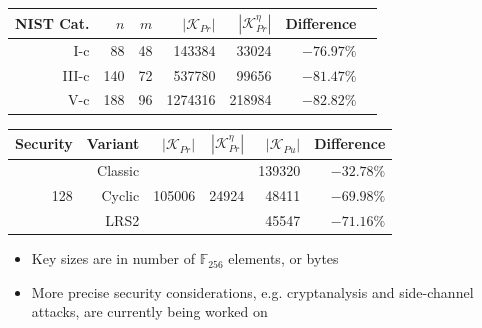 \documentclass[12pt]{beamer}
\begin{document}
\begin{frame}
  \begin{table}[htbp]
    \setlength{\tabcolsep}{8pt}
    \centering
    \begin{tabular}{*{7}{r}}
      \toprule
      NIST Cat. & $n$ & $m$ & $|\mathcal{K}_{Pr}|$
           & $|\mathcal{K}_{Pr} ^{\eta}|$ & Difference \\ \midrule
      I-c    &   88 &   48 &   143384 &   33024 & $-76.97\%$ \\
      III-c  &  140 &   72 &   537780 &   99656 & $-81.47\%$ \\
      V-c    &  188 &   96 &  1274316 &  218984 & $-82.82\%$ \\
      \bottomrule
    \end{tabular}
  \end{table}
    \begin{table}[htbp]
    \setlength{\tabcolsep}{7pt}
    \centering
    \begin{tabular}{*{6}{r}}
      \toprule
      Security & Variant
        & $|\mathcal{K}_{Pr}|$ & $|\mathcal{K}_{Pr}^{\eta}|$
        & $|\mathcal{K}_{Pu}|$ & Difference \\ \midrule
      \multirow{3}{*}{128}
        &  Classic &  \multirow{3}{*}{105006} &  \multirow{3}{*}{24924}
                                                &  139320 & $-32.78\%$ \\
        &   Cyclic &                          & &   48411 & $-69.98\%$ \\
        &     LRS2 &                          & &   45547 & $-71.16\%$ \\
      \bottomrule
    \end{tabular}
  \end{table}
  \begin{itemize}
    \item Key sizes are in number of $\mathbb{F}_{256}$ elements, or bytes
    \item More precise security considerations, e.g. cryptanalysis and
        side-channel attacks, are currently being worked on
  \end{itemize}
\end{frame}


\nobibliography{\jobname}
\end{document}
